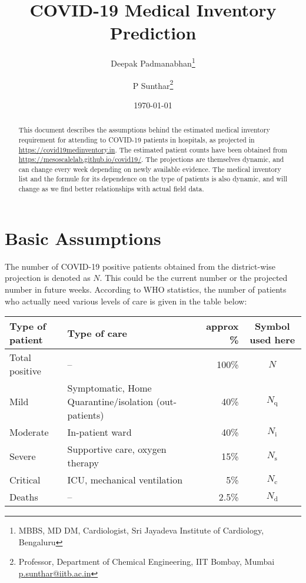 \documentclass{article}
\newcommand{\email}[1]{\href{mailto:#1}{#1}}
\newcommand{\nd}{\ensuremath{N_{\mathrm{d}}}}
\newcommand{\nc}{\ensuremath{N_{\mathrm{c}}}}
\newcommand{\ns}{\ensuremath{N_{\mathrm{s}}}}
\newcommand{\nin}{\ensuremath{N_{\mathrm{i}}}}
\newcommand{\nq}{\ensuremath{N_{\mathrm{q}}}}
\begin{document}
\title{COVID-19 Medical Inventory Prediction}
\date{\today}
\author{Deepak Padmanabhan\thanks{MBBS, MD DM, Cardiologist, Sri Jayadeva
    Institute of Cardiology, Bengaluru}
  \and
  P Sunthar\thanks{Professor, Department of Chemical Engineering, IIT
    Bombay, Mumbai \email{p.sunthar@iitb.ac.in}}
}
\maketitle
\begin{abstract}
  This document describes the assumptions behind the estimated medical
  inventory requirement for attending to COVID-19 patients in
  hospitals, as projected in \url{https://covid19medinventory.in}. The
  estimated patient counts have been obtained from
  \url{https://mesoscalelab.github.io/covid19/}. The projections are
  themselves dynamic, and can change every week depending on newly
  available evidence. The medical inventory list and the formule for
  its dependence on the type of patients is also dynamic, and will
  change as we find better relationships with actual field data.
\end{abstract}

\section{Basic Assumptions}

The number of COVID-19 positive patients obtained from the
district-wise projection\cite{ansualok20} is denoted as $N$. This could
be the current number or the projected number in future weeks.
According to WHO statistics\cite{who19mar}, the number of patients who
actually need various levels of care \cite{aiims2020a} is given in the
table below:

\noindent
\begin{tabularx}{\linewidth}{XXrc}
  \toprule
  Type of patient & Type of care & approx \% & Symbol used here \\
  \midrule
  Total positive & -- & 100\% & $N$ \\
  Mild & Symptomatic, Home Quarantine/isolation (out-patients) & 40\% & \nq \\
  Moderate & In-patient ward & 40\% & \nin \\
  Severe & Supportive care, oxygen therapy   & 15\% & \ns \\
  Critical & ICU, mechanical ventilation & 5\% & \nc \\
  Deaths & --  & 2.5\% & \nd \\
\bottomrule  
\end{tabularx}
\end{document}
